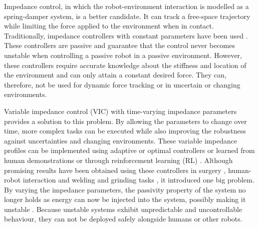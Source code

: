 Impedance control, in which the robot-environment interaction is modelled as a spring-damper system, is a better candidate. It can track a free-space trajectory while limiting the force applied to the environment when in contact. Traditionally, impedance controllers with constant parameters have been used \cite{hoganImpedanceControlApproach1985,hoganStableExecutionContact1987,calancaReviewAlgorithmsCompliant2016,songTutorialSurveyComparison2019,cheahLearningImpedanceControl1998,liHumanRobotCollaboration2013,heAdaptiveNeuralImpedance2015,liAdaptiveImpedanceControl2016,jamwalImpedanceControlIntrinsically2016,jungForceTrackingImpedance2004,ottPrioritizedMultitaskCompliance2015}. These controllers are passive and guarantee that the control never becomes unstable when controlling a passive robot in a passive environment. However, these controllers require accurate knowledge about the stiffness and location of the environment and can only attain a constant desired force. They can, therefore, not be used for dynamic force tracking or in uncertain or changing environments.

Variable impedance control (VIC) with time-varying impedance parameters provides a solution to this problem. By allowing the parameters to change over time, more complex tasks can be executed while also improving the robustness against uncertainties and changing environments. These variable impedance profiles can be implemented using adaptive or optimal controllers \cite{songTutorialSurveyComparison2019,erdenAssistingManualWelding2011,erdenRoboticAssistanceImpedance2016,leeForceTrackingImpedance2008,ikeuraOptimalVariableImpedance2002,medinaRisksensitiveInteractionControl2013,yangHumanlikeAdaptationForce2011} or learned from human demonstrations or through reinforcement learning (RL) \cite{buchliLearningVariableImpedance2011,rombokasTendondrivenVariableImpedance2013a,michelBilateralTeleoperationAdaptive2021,chenClosedLoopVariableStiffness2021,weiImpedanceControlUncertain2019,houVariableImpedanceControl2020,abu-dakkaVariableImpedanceControl2020,calinonLearningbasedControlStrategy2010,kronanderOnlineLearningVarying2012}. Although promising results have been obtained using these controllers in surgery \cite{ferragutiEnergyTankBasedInteractive2015, ferragutiTankbasedApproachImpedance2013}, human-robot interaction \cite{wuAdaptiveImpedanceControl2020,san-miguelAutomatedOffLineGeneration2022,sharifiImpedanceLearningBasedAdaptive2021} and welding and grinding tasks \cite{erdenAssistingManualWelding2011,erdenRoboticAssistanceImpedance2016,zhangLearningImpedanceRegulation2021,wangSafeOnlineGain2021}, it introduced one big problem. By varying the impedance parameters, the passivity property of the system no longer holds as energy can now be injected into the system, possibly making it unstable \cite{ferragutiTankbasedApproachImpedance2013}. Because unstable systems exhibit unpredictable and uncontrollable behaviour, they can not be deployed safely alongside humans or other robots.


